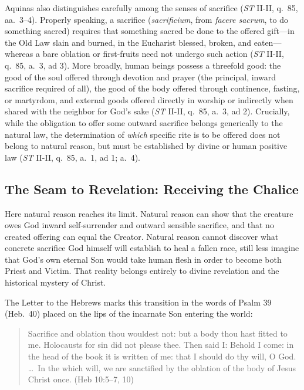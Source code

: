 Aquinas also distinguishes carefully among the senses of sacrifice (\emph{ST} II-II, q.\ 85, aa.\ 3--4). Properly speaking, a sacrifice (\emph{sacrificium}, from \emph{facere sacrum}, to do something sacred) requires that something sacred be done to the offered gift---in the Old Law slain and burned, in the Eucharist blessed, broken, and eaten---whereas a bare oblation or first-fruits need not undergo such action (\emph{ST} II-II, q.\ 85, a.\ 3, ad 3). More broadly, human beings possess a threefold good: the good of the soul offered through devotion and prayer (the principal, inward sacrifice required of all), the good of the body offered through continence, fasting, or martyrdom, and external goods offered directly in worship or indirectly when shared with the neighbor for God's sake (\emph{ST} II-II, q.\ 85, a.\ 3, ad 2). Crucially, while the obligation to offer some outward sacrifice belongs generically to the natural law, the determination of \emph{which} specific rite is to be offered does not belong to natural reason, but must be established by divine or human positive law (\emph{ST} II-II, q.\ 85, a.\ 1, ad 1; a.\ 4).

\subsection{The Seam to Revelation: Receiving the Chalice}

Here natural reason reaches its limit. Natural reason can show that the creature owes God inward self-surrender and outward sensible sacrifice, and that no created offering can equal the Creator. Natural reason cannot discover what concrete sacrifice God himself will establish to heal a fallen race, still less imagine that God's own eternal Son would take human flesh in order to become both Priest and Victim. That reality belongs entirely to divine revelation and the historical mystery of Christ.

The Letter to the Hebrews marks this transition in the words of Psalm 39 (Heb.\ 40) placed on the lips of the incarnate Son entering the world:

\begin{quote}
Sacrifice and oblation thou wouldest not: but a body thou hast fitted to me. Holocausts for sin did not please thee. Then said I: Behold I come: in the head of the book it is written of me: that I should do thy will, O God. \dots\ In the which will, we are sanctified by the oblation of the body of Jesus Christ once. (Heb 10:5--7, 10)
\end{quote}

